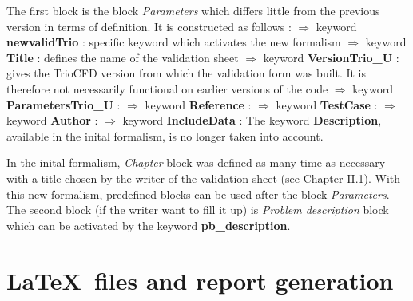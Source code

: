 The first block is the block \textit{Parameters} which differs little from the previous version in terms of definition. It is constructed as follows :\smallskip\newline
$\Rightarrow$ keyword \textbf{newvalidTrio} : specific keyword which activates the new formalism \newline
$\Rightarrow$ keyword \textbf{Title} : defines the name of the validation sheet \newline
$\Rightarrow$ keyword \textbf{VersionTrio\_U} : gives the TrioCFD version from which the validation form was built. It is therefore not necessarily functional on earlier versions of the code \newline
$\Rightarrow$ keyword \textbf{ParametersTrio\_U} : \newline
$\Rightarrow$ keyword \textbf{Reference} : \newline
$\Rightarrow$ keyword \textbf{TestCase} : \newline
$\Rightarrow$ keyword \textbf{Author} : \newline
$\Rightarrow$ keyword \textbf{IncludeData} : \newline
The keyword \textbf{Description}, available in the inital formalism, is no longer taken into account.\smallskip\newline

In the inital formalism, \textit{Chapter} block was defined as many time as necessary with a title chosen by the writer of the validation sheet (see Chapter II.1). With this new formalism, predefined blocks can be used after the block \textit{Parameters}.\smallskip\newline
The second block (if the writer want to fill it up) is \textit{Problem description} block which can be activated by the keyword \textbf{pb\_description}.

\chapter{\label{chap:Validation-report-generation}\LaTeX~files and report generation}
